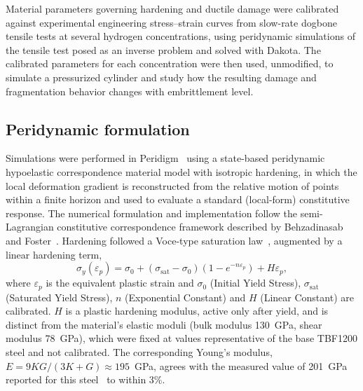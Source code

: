 \documentclass[pdflatex,sn-mathphys-num]{sn-jnl}%
\theoremstyle{thmstyleone}%
\theoremstyle{thmstyletwo}%
\theoremstyle{thmstylethree}%
\begin{document}
Material parameters governing hardening and ductile damage were calibrated against experimental
engineering stress--strain curves from slow-rate dogbone tensile tests at several hydrogen
concentrations, using peridynamic simulations of the tensile test posed as an inverse problem and
solved with Dakota. The calibrated parameters for each concentration were then used, unmodified, to
simulate a pressurized cylinder and study how the resulting damage and fragmentation behavior
changes with embrittlement level.

\subsection{Peridynamic formulation}\label{subsec2a}

Simulations were performed in Peridigm~\cite{peridigm} using a state-based peridynamic~\cite{silling2007states} hypoelastic correspondence
material model with isotropic hardening, in which the local deformation gradient is reconstructed
from the relative motion of points within a finite horizon and used to evaluate a standard
(local-form) constitutive response. The numerical formulation and implementation follow the semi-Lagrangian constitutive correspondence framework described by Behzadinasab and Foster~\cite{behzadinasab2020semilagrangian}. Hardening followed a Voce-type saturation law~\cite{voce1948}, augmented by a linear hardening term,
\begin{equation}
  \sigma_y(\varepsilon_p) = \sigma_0 + (\sigma_{\mathrm{sat}} - \sigma_0)\left(1 - e^{-n\varepsilon_p}\right) + H\varepsilon_p,
\end{equation}
where $\varepsilon_p$ is the equivalent plastic strain and $\sigma_0$ (Initial Yield Stress),
$\sigma_{\mathrm{sat}}$ (Saturated Yield Stress), $n$ (Exponential Constant) and $H$ (Linear
Constant) are calibrated. $H$ is a plastic hardening modulus, active only after yield, and is
distinct from the material's elastic moduli (bulk modulus 130~GPa, shear modulus 78~GPa), which were
fixed at values representative of the base TBF1200 steel and not calibrated.  The corresponding
Young's modulus, $E = 9KG/(3K+G) \approx 195$~GPa, agrees with the measured value of 201~GPa
reported for this steel~\cite{nieto2024thesis} to within 3\%.
\end{document}
